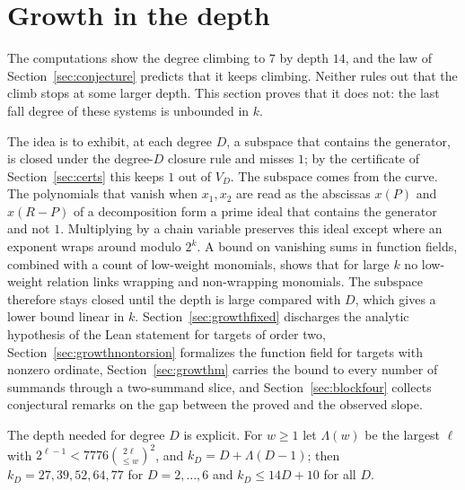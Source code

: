 \documentclass[11pt]{article}
\theoremstyle{definition}\newtheorem{definition}[theorem]{Definition}
\theoremstyle{remark}\newtheorem{remark}[theorem]{Remark}
\begin{document}
\section{Growth in the depth}\label{sec:growth}
The computations show the degree climbing to $7$ by depth $14$, and the law
of Section~\ref{sec:conjecture} predicts that it keeps climbing. Neither
rules out that the climb stops at some larger depth. This section proves
that it does not: the last fall degree of these systems is unbounded in $k$.

The idea is to exhibit, at each degree $D$, a subspace that contains the
generator, is closed under the degree-$D$ closure rule and misses $1$; by
the certificate of Section~\ref{sec:certs} this keeps $1$ out of $V_D$. The
subspace comes from the curve. The polynomials that vanish when $x_1,x_2$
are read as the abscissas $x(P)$ and $x(R-P)$ of a decomposition form a
prime ideal that contains the generator and not $1$. Multiplying by a chain
variable preserves this ideal except where an exponent wraps around modulo
$2^k$. A bound on vanishing sums in function fields, combined with a count
of low-weight monomials, shows that for large $k$ no low-weight relation
links wrapping and non-wrapping monomials. The subspace therefore stays
closed until the depth is large compared with $D$, which gives a lower
bound linear in $k$. Section~\ref{sec:growthfixed} discharges the analytic
hypothesis of the Lean statement for targets of order two,
Section~\ref{sec:growthnontorsion} formalizes the function field for
targets with nonzero ordinate, Section~\ref{sec:growthm} carries the bound
to every number of summands through a two-summand slice, and
Section~\ref{sec:blockfour} collects
conjectural remarks on the gap between the proved and the observed slope.

The depth needed for degree $D$ is explicit. For $w\ge1$ let $\Lambda(w)$
be the largest $\ell$ with $2^{\ell-1}<7776\binom{2\ell}{\le w}^2$, and
$k_D=D+\Lambda(D-1)$; then $k_D=27,39,52,64,77$ for $D=2,\ldots,6$ and
$k_D\le14D+10$ for all $D$.
\end{document}
